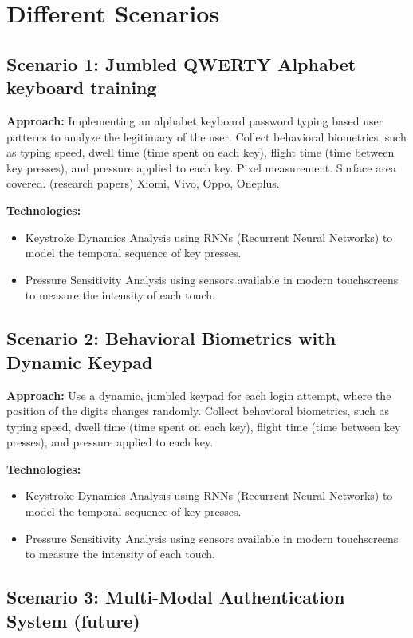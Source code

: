 \documentclass{article}
\begin{document}
\section*{Different Scenarios}

\subsection*{Scenario 1: Jumbled QWERTY Alphabet keyboard training}

\textbf{Approach:}
Implementing an alphabet keyboard password typing based user patterns to analyze the legitimacy of the user.
Collect behavioral biometrics, such as typing speed, dwell time (time spent on each key), flight time (time between key presses), and pressure applied to each key. Pixel measurement. Surface area covered. (research papers)
Xiomi, Vivo, Oppo, Oneplus.

\textbf{Technologies:}
\begin{itemize}[label=--,leftmargin=*]
    \item Keystroke Dynamics Analysis using RNNs (Recurrent Neural Networks) to model the temporal sequence of key presses.
    \item Pressure Sensitivity Analysis using sensors available in modern touchscreens to measure the intensity of each touch.
\end{itemize}

\subsection*{Scenario 2: Behavioral Biometrics with Dynamic Keypad}

\textbf{Approach:}
Use a dynamic, jumbled keypad for each login attempt, where the position of the digits changes randomly.
Collect behavioral biometrics, such as typing speed, dwell time (time spent on each key), flight time (time between key presses), and pressure applied to each key.

\textbf{Technologies:}
\begin{itemize}[label=--,leftmargin=*]
    \item Keystroke Dynamics Analysis using RNNs (Recurrent Neural Networks) to model the temporal sequence of key presses.
    \item Pressure Sensitivity Analysis using sensors available in modern touchscreens to measure the intensity of each touch.
\end{itemize}

\subsection*{Scenario 3: Multi-Modal Authentication System (future)}
\end{document}
